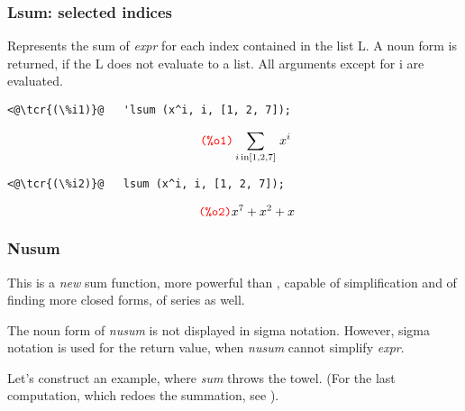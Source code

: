 \documentclass[../Maxima_Workbook.tex]{subfiles}
\begin{document}
\subsubsection{Lsum: selected indices}

\lz {} \hfill \tcr{[function]}

\lz Represents the sum of \emph{expr} for each index contained in the list L. A noun form is returned, if the L does not evaluate to a list. All arguments except for i are evaluated.

\lz \begin{small}
\color{blue} \leqn
\begin{lstlisting}
<@\tcr{(\%i1)}@   'lsum (x^i, i, [1, 2, 7]);
\end{lstlisting}
\vspace{-5mm} \[\tag*{\tcr{\ttfamily (\%o1)}} \sum_{i\operatorname{in}[1,2,7]}{\left. {{x}^{i}}\right.} \]
\vspace{-7mm} \begin{lstlisting}
<@\tcr{(\%i2)}@   lsum (x^i, i, [1, 2, 7]);
\end{lstlisting}
\vspace{-5mm} \[\tag*{\tcr{\ttfamily (\%o2)}} {{x}^{7}}+{{x}^{2}}+x \]
\color{black} \reqn
\end{small} \vspace{-6mm}

\subsubsection{Nusum}

\lz {} \hfill \tcr{[function]}

\lz This is a \emph{new} sum function, more powerful than , capable of simplification and of finding more closed forms, of series as well.

\lz The noun form of \emph{nusum} is not displayed in sigma notation. However, sigma notation is used for the return value, when \emph{nusum} cannot simplify \emph{expr}. 

\lz Let's construct an example, where \emph{sum} throws the towel. (For the last computation, which redoes the summation, see ).
\end{document}
